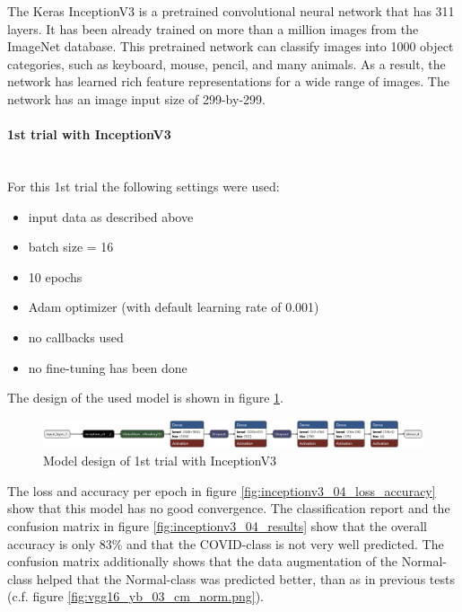 \documentclass{article}
\begin{document}
The Keras InceptionV3 is a pretrained convolutional neural network that has 311 layers. It has been already trained on more than a million images from the ImageNet database. This pretrained network can classify images into 1000 object categories, such as keyboard, mouse, pencil, and many animals. As a result, the network has learned rich feature representations for a wide range of images. The network has an image input size of 299-by-299. 

\paragraph{1st trial with InceptionV3}\mbox{}\\
For this 1st trial the following settings were used: 
\begin{itemize}
\item input data as described above
\item batch size = 16
\item 10 epochs 
\item Adam optimizer (with default learning rate of 0.001)
\item no callbacks used
\item no fine-tuning has been done
\end{itemize}

The design of the used model is shown in figure \ref{fig:inceptionv3_04.keras_model_design}.
\begin{figure}[ht] %
    \centering
    \includegraphics[width=1.0\linewidth]{inceptionv3_04.keras_model_design_nice.png}
    \caption{Model design of 1st trial with InceptionV3}
    \label{fig:inceptionv3_04.keras_model_design}
\end{figure}

The loss and accuracy per epoch in figure \ref{fig:inceptionv3_04_loss_accuracy} show that this model has no good convergence. The classification report and the confusion matrix in figure \ref{fig:inceptionv3_04_results} show that the overall accuracy is only 83\% and that the COVID-class is not very well predicted. The confusion matrix additionally shows that the data augmentation of the Normal-class helped that the Normal-class was predicted better, than as in previous tests (c.f. figure \ref{fig:vgg16_yb_03_cm_norm.png}).
\end{document}
